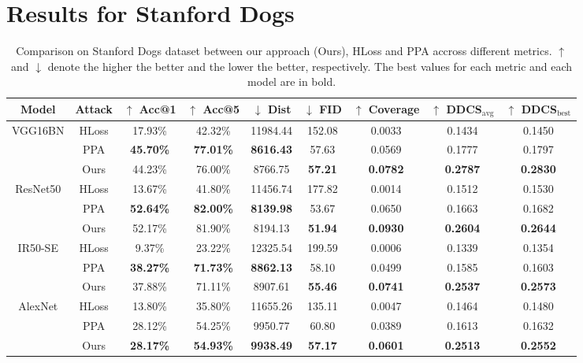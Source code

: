 \section{Results for Stanford Dogs}
\begin{table*}[htb]
	\centering
	\begin{tabular}{ | c | c | c c c c c | c c | }
		\hline
		Model & Attack & $\uparrow$ Acc@1 & $\uparrow$ Acc@5 & $\downarrow$ Dist & $\downarrow$ FID & $\uparrow$ Coverage & $\uparrow$ DDCS$_{\text{avg}}$ & $\uparrow$ DDCS$_{\text{best}}$ \\
		\hline
		\multirow{3}{*}{VGG16BN} & HLoss & 17.93\% & 42.32\% & 11984.44 & 152.08 & 0.0033 & 0.1434 & 0.1450 \\
        & PPA & \bf 45.70\% & \bf 77.01\% & \bf 8616.43 & 57.63 & 0.0569 & 0.1777 & 0.1797 \\
		& Ours & 44.23\% & 76.00\% & 8766.75 & \bf 57.21 & \bf 0.0782 & \bf 0.2787 & \bf 0.2830 \\
		\hline
		\multirow{3}{*}{ResNet50} & HLoss & 13.67\% & 41.80\% & 11456.74 & 177.82 & 0.0014 & 0.1512 & 0.1530 \\
        & PPA & \bf 52.64\% & \bf 82.00\% & \bf 8139.98 & 53.67 & 0.0650 & 0.1663 & 0.1682 \\
		& Ours & 52.17\% & 81.90\% & 8194.13 & \bf 51.94 & \bf 0.0930 & \bf 0.2604 & \bf 0.2644 \\
		\hline
		\multirow{3}{*}{IR50-SE} & HLoss & 9.37\% & 23.22\% & 12325.54 & 199.59 & 0.0006 & 0.1339 & 0.1354 \\
        & PPA & \bf 38.27\% & \bf 71.73\% & \bf 8862.13 & 58.10 & 0.0499 & 0.1585 & 0.1603 \\
		& Ours & 37.88\% & 71.11\% & 8907.61 & \bf 55.46 & \bf 0.0741 & \bf 0.2537 & \bf 0.2573 \\
		\hline
		\multirow{3}{*}{AlexNet} & HLoss & 13.80\% & 35.80\% & 11655.26 & 135.11 & 0.0047 & 0.1464 & 0.1480 \\
        & PPA & 28.12\% & 54.25\% & 9950.77 & 60.80 & 0.0389 & 0.1613 & 0.1632 \\
		& Ours & \bf 28.17\% & \bf 54.93\% & \bf 9938.49 & \bf 57.17 & \bf 0.0601 & \bf 0.2513 & \bf 0.2552 \\
		\hline
	\end{tabular}
	\caption{Comparison on Stanford Dogs dataset between our approach (Ours), HLoss and PPA accross different metrics. $\uparrow$ and $\downarrow$ denote the higher the better and the lower the better, respectively. The best values for each metric and each model are in bold.}
	\label{exp:result:stanforddogs}
\end{table*}

